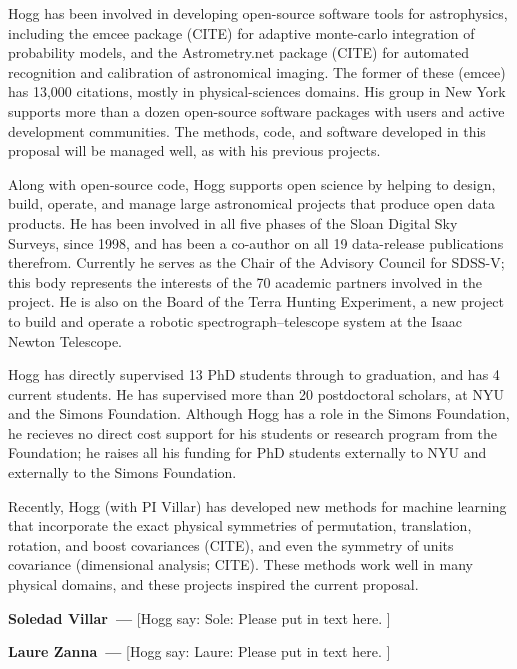 \documentclass[11pt]{article}
\renewcommand{\paragraph}[1]{\medskip\par\noindent\textbf{#1~---}}
\newcommand{\hogg}[1]{{\color{red}[Hogg say: #1 ]}}
\begin{document}
Hogg has been involved in developing open-source software tools for astrophysics, including the emcee package (CITE) for adaptive monte-carlo integration of probability models, and the Astrometry.net package (CITE) for automated recognition and calibration of astronomical imaging.
The former of these (emcee) has 13,000 citations, mostly in physical-sciences domains.
His group in New York supports more than a dozen open-source software packages with users and active development communities.
The methods, code, and software developed in this proposal will be managed well, as with his previous projects.

Along with open-source code, Hogg supports open science by helping to design, build, operate, and manage large astronomical projects that produce open data products.
He has been involved in all five phases of the Sloan Digital Sky Surveys, since 1998, and has been a co-author on all 19 data-release publications therefrom.
Currently he serves as the Chair of the Advisory Council for SDSS-V; this body represents the interests of the 70 academic partners involved in the project.
He is also on the Board of the Terra Hunting Experiment, a new project to build and operate a robotic spectrograph--telescope system at the Isaac Newton Telescope.

Hogg has directly supervised 13 PhD students through to graduation, and has 4 current students.
He has supervised more than 20 postdoctoral scholars, at NYU and the Simons Foundation.
Although Hogg has a role in the Simons Foundation, he recieves no direct cost support for his students or research program from the Foundation; he raises all his funding for PhD students externally to NYU and externally to the Simons Foundation.

Recently, Hogg (with PI Villar) has developed new methods for machine learning that incorporate the exact physical symmetries of permutation, translation, rotation, and boost covariances (CITE), and even the symmetry of units covariance (dimensional analysis; CITE).
These methods work well in many physical domains, and these projects inspired the current proposal.

\paragraph{Soledad Villar} \hogg{Sole: Please put in text here.}

\paragraph{Laure Zanna} \hogg{Laure: Please put in text here.}
\end{document}
